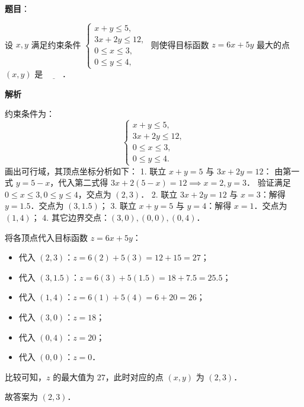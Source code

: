 \begin{answer}

\textbf{题目}：

设 $x, y$ 满足约束条件 $\begin{cases} x + y \leqslant 5, \\ 3x + 2y \leqslant 12, \\ 0 \leqslant x \leqslant 3, \\ 0 \leqslant y \leqslant 4, \end{cases}$ 则使得目标函数 $z = 6x + 5y$ 最大的点 $(x, y)$ 是 $\underline{\hspace{2em}}$．

\textbf{解析}

约束条件为：
\nopagebreak[4]
\[
\begin{cases}
x + y \leqslant 5, \\
3x + 2y \leqslant 12, \\
0 \leqslant x \leqslant 3, \\
0 \leqslant y \leqslant 4.
\end{cases}
\]
画出可行域，其顶点坐标分析如下：
1. 联立 $x + y = 5$ 与 $3x + 2y = 12$：
由第一式 $y = 5 - x$，代入第二式得 $3x + 2(5 - x) = 12 \implies x = 2, y = 3$．
验证满足 $0 \leqslant x \leqslant 3, 0 \leqslant y \leqslant 4$，交点为 $(2, 3)$．
2. 联立 $3x + 2y = 12$ 与 $x = 3$：解得 $y = 1.5$．交点为 $(3, 1.5)$；
3. 联立 $x + y = 5$ 与 $y = 4$：解得 $x = 1$．交点为 $(1, 4)$；
4. 其它边界交点：$(3, 0), (0, 0), (0, 4)$．

将各顶点代入目标函数 $z = 6x + 5y$：
\begin{itemize}
\item 代入 $(2, 3)$：$z = 6(2) + 5(3) = 12 + 15 = 27$；
\item 代入 $(3, 1.5)$：$z = 6(3) + 5(1.5) = 18 + 7.5 = 25.5$；
\item 代入 $(1, 4)$：$z = 6(1) + 5(4) = 6 + 20 = 26$；
\item 代入 $(3, 0)$：$z = 18$；
\item 代入 $(0, 4)$：$z = 20$；
\item 代入 $(0, 0)$：$z = 0$．
\end{itemize}

比较可知，$z$ 的最大值为 $27$，此时对应的点 $(x, y)$ 为 $(2, 3)$．

故答案为 $(2, 3)$．


\end{answer}
